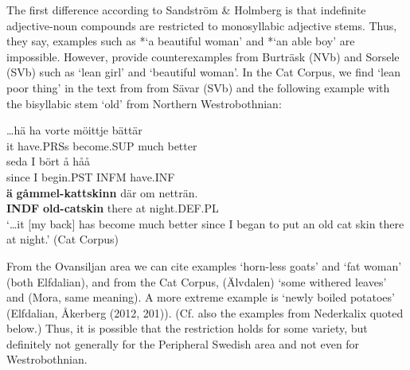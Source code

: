 
The first difference according to Sandström \& Holmberg is that indefinite adjective-noun compounds are restricted to monosyllabic adjective stems. Thus, they say, examples such as *‘a beautiful woman’ and *‘an able boy’ are impossible. However, \citet[47]{BergholmEtAl1999} provide counterexamples from Burträsk (NVb) and Sorsele (SVb) such as  ‘lean girl’ and  ‘beautiful woman’. In the Cat Corpus, we find  ‘lean poor thing’ in the text from from Sävar (SVb) and the following example with the bisyllabic stem  ‘old’ from Northern Westrobothnian:


\ea\label{}
\gll …hä  ha  vorte  möittje  bättär\\
it  have.PRSs  become.SUP  much  better\\
\gll seda  I  bört  å  håå\\
since  I  begin.PST  INFM  have.INF\\
\gll \textbf{ä}\textbf{  gåmmel-kattskinn} där  om  netträn.\\
\textbf{INDF} \textbf{old-catskin} there  at   night.DEF.PL\\
\glt ‘…it [my back] has become much better since I began to put an old cat skin there at night.’ (Cat Corpus) 
\z

From the Ovansiljan area we can cite \citet[52]{Levander1909} examples  ‘horn-less goats’ and  ‘fat woman’ (both Elfdalian), and from the Cat Corpus,  (Älvdalen) ‘some withered leaves’ and (Mora, same meaning). A more extreme example is \textbf{ }‘newly boiled potatoes’ (Elfdalian, Åkerberg (2012, 201)). (Cf. also the examples from Nederkalix quoted below.) Thus, it is possible that the restriction holds for some variety, but definitely not generally for the Peripheral Swedish area and not even for Westrobothnian. 

